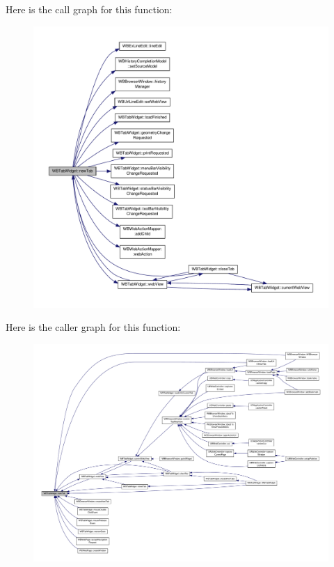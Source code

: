 Here is the call graph for this function\-:
\nopagebreak
\begin{figure}[H]
\begin{center}
\leavevmode
\includegraphics[width=350pt]{de/dc7/class_w_b_tab_widget_ac4e5333657411084af40f7faa20cac55_cgraph}
\end{center}
\end{figure}




Here is the caller graph for this function\-:
\nopagebreak
\begin{figure}[H]
\begin{center}
\leavevmode
\includegraphics[width=350pt]{de/dc7/class_w_b_tab_widget_ac4e5333657411084af40f7faa20cac55_icgraph}
\end{center}
\end{figure}


